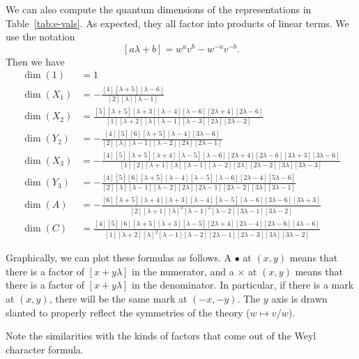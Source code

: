 \documentclass[12pt]{amsart}
\begin{document}
We can also compute the quantum dimensions of the representations in
Table~\ref{tab:e-vals}. As expected, they all factor into products of
linear terms. We use the notation
\[
[a\lambda + b] = w^av^b - w^{-a}v^{-b}.
\]
Then we have
\begin{align*}
  \dim(1) &= 1 \\
  \dim(X_1) &= -\frac{[4][\lambda+5][\lambda-6]}{[2][\lambda][\lambda-1]}\\
  \dim(X_2) &= \frac{[5][\lambda+5][\lambda+3][\lambda-4][\lambda-6][2\lambda+4][2\lambda-6]}
                  {[1][\lambda+2][\lambda][\lambda-1][\lambda-3][2\lambda][2\lambda-2]}\\
  \dim(Y_2) &= -\frac{[4][5][6][\lambda+5][\lambda-4][3\lambda-6]}
                 {[2][\lambda][\lambda-1][\lambda-2][2\lambda][2\lambda-1]}\\
  \dim(X_3) &= - \frac{[4][5][\lambda+5][\lambda+4][\lambda-5][\lambda-6][2\lambda+4][2\lambda-6][3\lambda+3][3\lambda-6]}
                 {[1][2][\lambda+1][\lambda][\lambda-1][\lambda-2][2\lambda][2\lambda-2][3\lambda][3\lambda-3]}\\
  \dim(Y_3) &= - \frac{[4][5][6][\lambda+5][\lambda-4][\lambda-5][\lambda-6][2\lambda-4][5\lambda-6]}
                     {[2][\lambda][\lambda-1][\lambda-2][2\lambda][2\lambda-1][2\lambda-2][3\lambda][3\lambda-1]}\\
  \dim(A)   &= - \frac{[6][\lambda+5][\lambda+4][\lambda+3][\lambda-4][\lambda-5][\lambda-6][3\lambda-6][3\lambda+3]}
                     {[2][\lambda+1][\lambda]^2[\lambda-1]^2[\lambda-2][3\lambda-1][3\lambda-2]}\\
  \dim(C)   &= \frac{[4][5][6][\lambda+5][\lambda+3][\lambda-5][2\lambda+4][2\lambda-4][2\lambda-6][4\lambda-6]}
                     {[1][\lambda+2][\lambda]^2[\lambda-1][\lambda-2][2\lambda-1][2\lambda-3][3\lambda][3\lambda-2]}
\end{align*}

Graphically, we can plot these formulas as follows. A $\bullet$ at
$(x,y)$ means that there is a factor of $[x+y\lambda]$ in the
numerator, and a $\times$ at $(x,y)$ means that there is a factor of
$[x+y\lambda]$ in the denominator. In particular, if there is a mark
at $(x,y)$, there will be the same mark at $(-x,-y)$. The $y$ axis is
drawn slanted to properly reflect the symmetries of the theory
($w \mapsto v/w$).

Note the similarities with the kinds of factors that come out of the
Weyl character formula.
\begingroup
\newcommand{\pnode}[2]{
  \node at (#1,#2) {$\bullet$};
  \node at (-#1,-#2) {$\bullet$};
}
\newcommand{\mnode}[2]{
  \node at (#1,#2) {$\times$};
  \node at (-#1,-#2) {$\times$};
}
\newcommand{\mnodes}[3]{
  \node[circle,draw,inner sep=0pt] at (#1,#2) {$\times$};
  \node[circle,draw,inner sep=0pt] at (-#1,-#2) {$\times$};
}
\newcommand{\axes}[2]{
  \draw (-#1-0.5,0) to (#1+0.5,0);
  \draw (0,-#2-0.5) to (0,#2+0.5);
  \foreach \x in {-#1,...,#1}
    \foreach \y in {-#2,...,#2}
      \fill (\x,\y) circle [radius=0.5pt];
}
\end{document}
